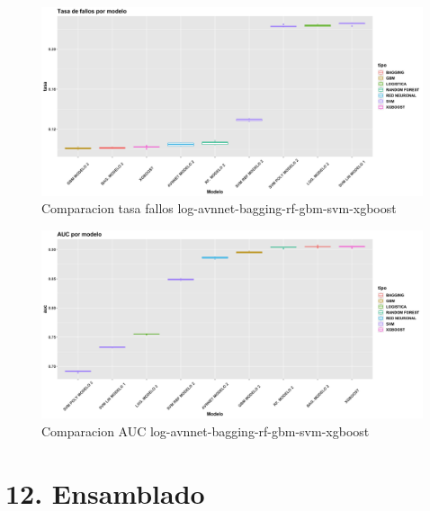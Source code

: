 \documentclass[
]{article}
\begin{document}
\begin{figure}[h!]

{\centering \includegraphics[width=0.99\linewidth,height=0.99\textheight,]{./charts/comparativas/07_log_avnnet_bagging_rf_gbm_svm_xgboost_tasa} 

}

\caption{Comparacion tasa fallos log-avnnet-bagging-rf-gbm-svm-xgboost}\label{fig:unnamed-chunk-137}
\end{figure}
\begin{figure}[h!]

{\centering \includegraphics[width=0.99\linewidth,height=0.99\textheight,]{./charts/comparativas/07_log_avnnet_bagging_rf_gbm_svm_xgboost_auc} 

}

\caption{Comparacion AUC log-avnnet-bagging-rf-gbm-svm-xgboost}\label{fig:unnamed-chunk-138}
\end{figure}

\hypertarget{ensamblado}{%
\section{12. Ensamblado}\label{ensamblado}}
\end{document}
